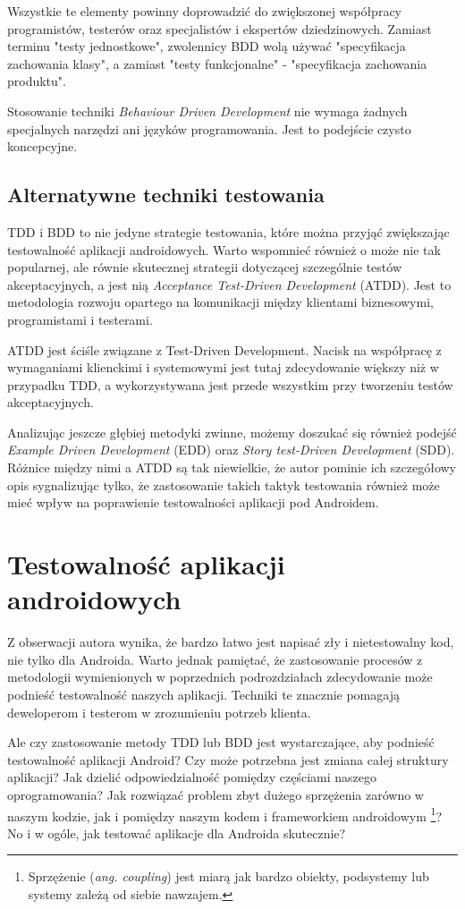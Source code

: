 Wszystkie te elementy powinny doprowadzić do zwiększonej współpracy programistów, testerów oraz specjalistów i ekspertów dziedzinowych. Zamiast terminu "testy jednostkowe", zwolennicy BDD wolą używać "specyfikacja zachowania klasy", a zamiast "testy funkcjonalne" - "specyfikacja zachowania produktu".

Stosowanie techniki \textit{Behaviour Driven Development} nie wymaga żadnych specjalnych narzędzi ani języków programowania. Jest to podejście czysto koncepcyjne.\cite{website:agile:guide}

\subsection{Alternatywne techniki testowania}
\label{alternatywne_metody_testowania}
TDD i BDD to nie jedyne strategie testowania, które można przyjąć zwiększając testowalność aplikacji androidowych. Warto wspomnieć również o może nie tak popularnej, ale równie skutecznej strategii dotyczącej szczególnie testów akceptacyjnych, a jest nią \textit{Acceptance Test-Driven Development} (ATDD). Jest to metodologia rozwoju opartego na komunikacji między klientami biznesowymi, programistami i testerami. 

ATDD jest ściśle związane z Test-Driven Development. Nacisk na współpracę z wymaganiami klienckimi i systemowymi jest tutaj zdecydowanie większy niż w przypadku TDD, a wykorzystywana jest przede wszystkim przy tworzeniu testów akceptacyjnych.

Analizując jeszcze głębiej metodyki zwinne, możemy doszukać się również podejść \textit{Example Driven Development} (EDD) oraz \textit{Story test-Driven Development} (SDD). Różnice między nimi a ATDD są tak niewielkie, że autor pominie ich szczegółowy opis sygnalizując tylko, że zastosowanie takich taktyk testowania również może mieć wpływ na poprawienie testowalności aplikacji pod Androidem.  

\section{Testowalność aplikacji androidowych}
Z obserwacji autora wynika, że bardzo łatwo jest napisać zły i nietestowalny kod, nie tylko dla Androida. Warto jednak pamiętać, że zastosowanie procesów z metodologii wymienionych w poprzednich podrozdziałach zdecydowanie może podnieść testowalność naszych aplikacji. Techniki te znacznie pomagają deweloperom i testerom w zrozumieniu potrzeb klienta.

Ale czy zastosowanie metody TDD lub BDD jest wystarczające, aby podnieść testowalność aplikacji Android? Czy może potrzebna jest zmiana całej struktury aplikacji? Jak dzielić odpowiedzialność pomiędzy częściami naszego oprogramowania? Jak rozwiązać problem zbyt dużego sprzężenia zarówno w naszym kodzie, jak i pomiędzy naszym kodem i frameworkiem androidowym \footnote{Sprzężenie (\textit{ang. coupling}) jest miarą jak bardzo obiekty, podsystemy lub systemy zależą od siebie nawzajem.}? No i w ogóle, jak testować aplikacje dla Androida skutecznie?


